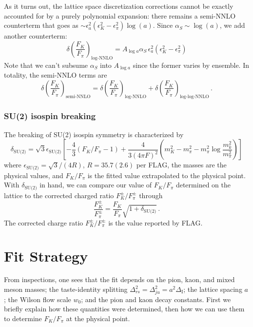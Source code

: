 \documentclass[prd,tightenlines,preprintnumbers,showpacs,superscriptaddress,notitlepage,eqsecnum,floatfix,notitlepage]{revtex4-1}
\begin{document}
As it turns out, the lattice space discretization corrections cannot be exactly accounted for by a purely polynomial expansion: there remains a semi-NNLO counterterm that goes as $\sim \epsilon_a^2 (\epsilon_K^2 - \epsilon_\pi^2) \log(a)$. Since $\alpha_S \sim \log(a)$, we add another counterterm:
\begin{equation}
\delta\left(\frac{F_K}{F_\pi}\right)_{\text{log-NNLO}} =
A_{\log a} \alpha_S \, \epsilon_a^2  (\epsilon_K^2 - \epsilon_\pi^2)
\end{equation}
Note that we can't subsume $\alpha_S$ into $A_{\log a}$ since the former varies by ensemble. In totality, the semi-NNLO terms are
\begin{equation}
\delta\left(\frac{F_K}{F_\pi}\right)_{\text{semi-NNLO}} =
\delta\left(\frac{F_K}{F_\pi}\right)_{\text{log-NNLO}}
+ \delta\left(\frac{F_K}{F_\pi}\right)_{\text{log-log-NNLO}}\, .
\end{equation}

\subsubsection{ SU(2) isospin breaking}
The breaking of SU(2) isospin symmetry is characterized by
\begin{equation}
\delta_{\text{SU(2)}} = \sqrt{3} \epsilon_\text{SU(2)} \left[
-\frac43 (F_K / F_\pi-1)
+\frac{4}{3(4 \pi F)^2} \left( m_K^2 - m_\pi^2 -m_\pi^2 \log \frac{m_k^2}{m_\pi^2} \right)
\right]
\end{equation}
where $\epsilon_\text{SU(2)} = \sqrt{3}/(4R)$, $R=35.7(2.6)$ per FLAG, the masses are the physical values, and $F_K/F_\pi$ is the fitted value extrapolated to the physical point. With $\delta_{\text{SU(2)}}$ in hand, we can compare our value of $F_K/F_\pi$ determined on the lattice to the corrected charged ratio $F^\pm_K/F^\pm_\pi$ through
\begin{equation}
\frac{F^\pm_K}{F^\pm_\pi} = \frac{F_K}{F_\pi} \sqrt{1+ \delta_{\text{SU(2)}}} \, .
\end{equation}
The corrected charge ratio $F^\pm_K/F^\pm_\pi$ is the value reported by FLAG.

\section{Fit Strategy}

From inspections, one sees that the fit depends on the pion, kaon, and mixed meson masses; the taste-identity splitting $\Delta_{rs}^2 = \Delta_{ju}^2 = a^2 \Delta_\text{I}$; the lattice spacing $a$; the Wilson flow scale $w_0$; and the pion and kaon decay constants. First we briefly explain how these quantities were determined, then how we can use them to determine $F_K / F_\pi$ at the physical point.
\end{document}
